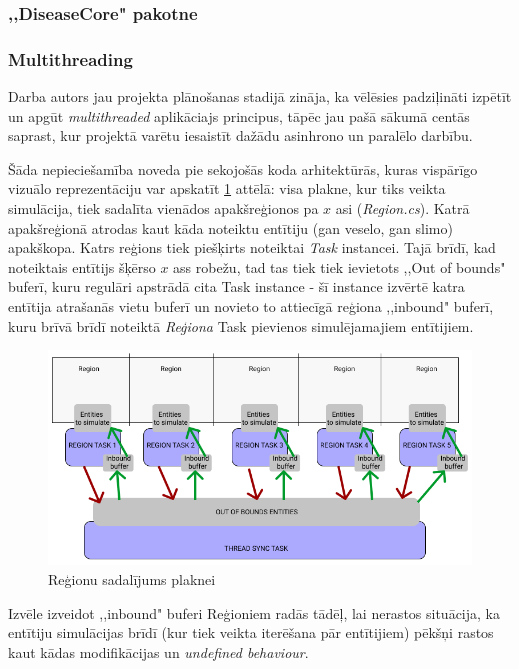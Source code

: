 \subsubsection{,,DiseaseCore" pakotne}
\subsubsection*{Multithreading}
Darba autors jau projekta plānošanas stadijā zināja, ka vēlēsies padziļināti
izpētīt un apgūt \emph{multithreaded} aplikāciajs principus, tāpēc jau pašā sākumā
centās saprast, kur projektā varētu iesaistīt dažādu asinhrono un paralēlo darbību.

Šāda nepieciešamība noveda pie sekojošās koda arhitektūrās, kuras vispārīgo
vizuālo reprezentāciju var apskatīt \ref{img:multithreaded-layout} attēlā: visa plakne, kur tiks
veikta simulācija, tiek sadalīta vienādos apakšreģionos pa \(x\) asi (\emph{Region.cs}).
Katrā apakšreģionā atrodas kaut kāda noteiktu entītiju (gan veselo, gan slimo) apakškopa.
Katrs reģions tiek piešķirts noteiktai \emph{Task}\cite{csharp:task} instancei.
Tajā brīdī, kad noteiktais entītijs šķērso \(x\) ass robežu, tad tas tiek tiek
ievietots ,,Out of bounds" buferī, kuru regulāri apstrādā cita Task instance - šī instance
izvērtē katra entītija atrašanās vietu buferī un novieto to attiecīgā reģiona
,,inbound" buferī, kuru brīvā brīdī noteiktā \emph{Reģiona} Task pievienos
simulējamajiem entītijiem.


\begin{figure}[H]
	\centering
	\includegraphics[scale=0.5]{images/multithreaded-layout.png}
	\caption{Reģionu sadalījums plaknei}
	\label{img:multithreaded-layout}
\end{figure}


Izvēle izveidot ,,inbound" buferi Reģioniem radās tādēļ, lai nerastos situācija,
ka entītiju simulācijas brīdī (kur tiek veikta iterēšana pār entītijiem) pēkšņi
rastos kaut kādas modifikācijas un \emph{undefined behaviour}.


